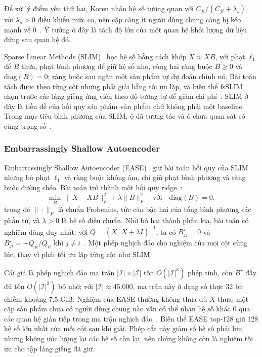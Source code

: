 Để xử lý điểm yếu thứ hai, Koren nhân hệ số tương quan với $C_{ji}/(C_{ji}+\lambda_s)$, với $\lambda_s>0$ điều khiển mức co, nên cặp càng ít người dùng chung càng bị kéo mạnh về 0~\cite{koren2008factorization}. Ý tưởng ở đây là tách độ lớn của một quan hệ khỏi lượng dữ liệu đứng sau quan hệ đó.

Sparse Linear Methods (SLIM)~\cite{ning2011slim} học hệ số bằng cách khớp $X\approx XB$, với phạt $\ell_1$ để $B$ thưa, phạt bình phương để giữ hệ số nhỏ, cùng hai ràng buộc $B\ge0$ và $\mathrm{diag}(B)=0$; ràng buộc sau ngăn một sản phẩm tự dự đoán chính nó. Bài toán tách được theo từng cột nhưng phải giải bằng tối ưu lặp, và biến thể fsSLIM chọn trước các láng giềng ứng viên theo độ tương tự để giảm chi phí~\cite{ning2011slim}. SLIM ở đây là tiền đề của hồi quy sản phẩm--sản phẩm chứ không phải một baseline. Trong mục tiêu bình phương của SLIM, ô đã tương tác và ô chưa quan sát có cùng trọng số~\cite{ning2011slim,steck2019ease}.

\subsubsection{Embarrassingly Shallow Autoencoder}
\label{sec:ease}

Embarrassingly Shallow Autoencoder (EASE)~\cite{steck2019ease} giữ bài toán hồi quy của SLIM nhưng bỏ phạt $\ell_1$ và ràng buộc không âm, chỉ giữ phạt bình phương và ràng buộc đường chéo. Bài toán trở thành một hồi quy ridge~\cite{hoerl1970ridge}:
\begin{equation}
\min_B\;\|X-XB\|_F^2+\lambda\|B\|_F^2 \quad\text{với}\quad \mathrm{diag}(B)=0 ,
\label{eq:ease}
\end{equation}
trong đó $\|\cdot\|_F$ là chuẩn Frobenius, tức căn bậc hai của tổng bình phương các phần tử, và $\lambda>0$ là hệ số điều chuẩn. Nhờ bỏ hai thành phần kia, bài toán có nghiệm đóng duy nhất: với $Q=(X^\top X+\lambda I)^{-1}$, ta có $B^\star_{jj}=0$ và $B^\star_{ji}=-Q_{ji}/Q_{ii}$ khi $j\ne i$~\cite{steck2019ease}. Một phép nghịch đảo cho nghiệm của mọi cột cùng lúc, thay vì phải tối ưu lặp từng cột như SLIM.

Cái giá là phép nghịch đảo ma trận $|\mathcal{I}|\times|\mathcal{I}|$ tốn $O(|\mathcal{I}|^3)$ phép tính, còn $B^\star$ đầy đủ tốn $O(|\mathcal{I}|^2)$ bộ nhớ; với $|\mathcal{I}|\approx45.000$, ma trận này ở dạng số thực 32 bit chiếm khoảng 7,5 GiB. Nghiệm của EASE thường không thưa dù $X$ thưa: một cặp sản phẩm chưa có người dùng chung nào vẫn có thể nhận hệ số khác 0 qua các quan hệ gián tiếp trong ma trận nghịch đảo~\cite{steck2019ease}. Biến thể EASE top-128 giữ 128 hệ số lớn nhất của mỗi cột sau khi giải. Phép cắt này giảm số hệ số phải lưu nhưng không ước lượng lại các hệ số còn lại, nên chúng không còn là nghiệm tối ưu cho tập láng giềng đã giữ.

